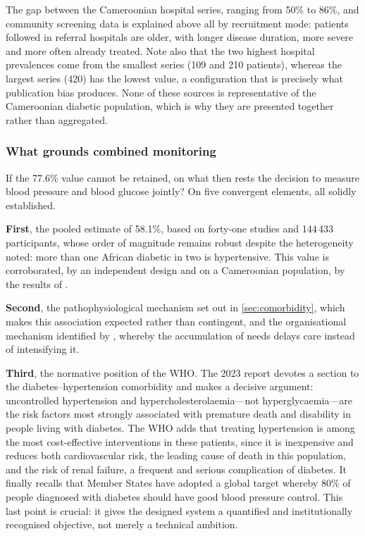 \documentclass[12pt,a4paper,oneside]{report}
\begin{document}
The gap between the Cameroonian hospital series, ranging from 50\% to 86\%, and community screening data is explained above all by recruitment mode: patients followed in referral hospitals are older, with longer disease duration, more severe and more often already treated. Note also that the two highest hospital prevalences come from the smallest series (109 and 210 patients), whereas the largest series (420) has the lowest value, a configuration that is precisely what publication bias produces. None of these sources is representative of the Cameroonian diabetic population, which is why they are presented together rather than aggregated.

\subsubsection{What grounds combined monitoring}

If the 77.6\% value cannot be retained, on what then rests the decision to measure blood pressure and blood glucose jointly? On five convergent elements, all solidly established.

\textbf{First}, the pooled estimate of 58.1\%, based on forty-one studies and 144\,433 participants, whose order of magnitude remains robust despite the heterogeneity noted: more than one African diabetic in two is hypertensive. This value is corroborated, by an independent design and on a Cameroonian population, by the results of \textcite{katte2014}.

\textbf{Second}, the pathophysiological mechanism set out in \cref{sec:comorbidity}, which makes this association expected rather than contingent, and the organisational mechanism identified by \textcite{hinneh2023}, whereby the accumulation of needs delays care instead of intensifying it.

\textbf{Third}, the normative position of the WHO. The 2023 report devotes a section to the diabetes--hypertension comorbidity and makes a decisive argument: uncontrolled hypertension and hypercholesterolaemia---not hyperglycaemia---are the risk factors most strongly associated with premature death and disability in people living with diabetes. The WHO adds that treating hypertension is among the most cost-effective interventions in these patients, since it is inexpensive and reduces both cardiovascular risk, the leading cause of death in this population, and the risk of renal failure, a frequent and serious complication of diabetes. It finally recalls that Member States have adopted a global target whereby 80\% of people diagnosed with diabetes should have good blood pressure control. This last point is crucial: it gives the designed system a quantified and institutionally recognised objective, not merely a technical ambition.
\end{document}
